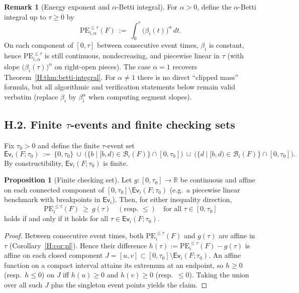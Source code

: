 \documentclass[11pt]{article}
\numberwithin{equation}{section}
\theoremstyle{plain}
\theoremstyle{definition}
\theoremstyle{remark}
\theoremstyle{plain}
\theoremstyle{definition}
\numberwithin{equation}{section}
\newtheorem{proposition}[theorem]{Proposition}
\theoremstyle{definition}
\newtheorem{remark}[theorem]{Remark}
\numberwithin{equation}{section}
\theoremstyle{plain}
\theoremstyle{definition}
\theoremstyle{remark}
\begin{document}
\begin{remark}[Energy exponent and $\alpha$-Betti integral]\label{H:rk:alpha}
For $\alpha>0$, define the $\alpha$-Betti integral up to $\tau\ge 0$ by
\[
\mathrm{PE}_{i,\alpha}^{\le \tau}(F)\ :=\ \int_{0}^{\tau} \bigl(\beta_i(t)\bigr)^{\alpha}\,dt.
\]
On each component of $[0,\tau]$ between consecutive event times, $\beta_i$ is constant, hence $\mathrm{PE}_{i,\alpha}^{\le \tau}$ is still continuous, nondecreasing, and piecewise linear in $\tau$ (with slope $\bigl(\beta_i(\tau)\bigr)^{\alpha}$ on right-open pieces). The case $\alpha=1$ recovers Theorem~\ref{H:thm:betti-integral}. For $\alpha\neq 1$ there is no direct ``clipped mass'' formula, but all algorithmic and verification statements below remain valid verbatim (replace $\beta_i$ by $\beta_i^{\alpha}$ when computing segment slopes).
\end{remark}

\subsection*{H.2. Finite \texorpdfstring{$\tau$}{tau}-events and finite checking sets}
Fix $\tau_0>0$ and define the finite $\tau$-event set
\[
\mathsf{Ev}_i(F;\tau_0)\ :=\ \{0,\tau_0\}\ \cup\ \bigl(\{b\mid [b,d)\in\mathcal{B}_i(F)\}\cap[0,\tau_0]\bigr)\ \cup\ \bigl(\{d\mid [b,d)\in\mathcal{B}_i(F)\}\cap[0,\tau_0]\bigr).
\]
By constructibility, $\mathsf{Ev}_i(F;\tau_0)$ is finite.

\begin{proposition}[Finite checking set]\label{H:prop:finite-check}
Let $g:[0,\tau_0]\to\mathbb{R}$ be continuous and affine on each connected component of $[0,\tau_0]\setminus \mathsf{Ev}_i(F;\tau_0)$ (e.g.\ a piecewise linear benchmark with breakpoints in $\mathsf{Ev}_i$). Then, for either inequality direction,
\[
\mathrm{PE}_i^{\le \tau}(F)\ \ge\ g(\tau)\quad(\text{resp.\ }\le)\quad\text{for all }\tau\in[0,\tau_0]
\]
holds if and only if it holds for all $\tau\in \mathsf{Ev}_i(F;\tau_0)$.
\end{proposition}

\begin{proof}
Between consecutive event times, both $\mathrm{PE}_i^{\le \tau}(F)$ and $g(\tau)$ are affine in $\tau$ (Corollary~\ref{H:cor:pl}). Hence their difference $h(\tau):=\mathrm{PE}_i^{\le \tau}(F)-g(\tau)$ is affine on each closed component $J=[u,v]\subset[0,\tau_0]\setminus \mathsf{Ev}_i(F;\tau_0)$.
An affine function on a compact interval attains its extremum at an endpoint, so $h\ge 0$ (resp.\ $h\le 0$) on $J$ iff $h(u)\ge 0$ and $h(v)\ge 0$ (resp.\ $\le 0$). Taking the union over all such $J$ plus the singleton event points yields the claim.
\end{proof}
\end{document}
